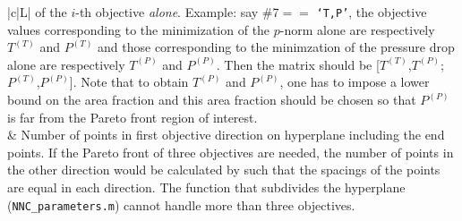 \documentclass[11pt,letterpaper]{article}
\begin{document}
\begin{table}[!h]
\begin{tabular}{|c|L|}
of the $i$-th objective \textit{alone}. Example: say \#7$==$ \texttt{`T,P'}, the objective values corresponding to the minimization of 
the $p$-norm alone are respectively $T^{(T)}$ and $P^{(T)}$ and those corresponding to the minimzation of the pressure drop alone are
respectively $T^{(P)}$ and $P^{(P)}$. Then the matrix should be [$T^{(T)}$,$T^{(P)}$;$P^{(T)}$,$P^{(P)}$].
Note that to obtain $T^{(P)}$ and $P^{(P)}$, one has to impose a lower bound on the area fraction and this area fraction should be 
chosen so that $P^{(P)}$ is far from the Pareto front region of interest. \\
 & Number of points in first objective direction on hyperplane including the end points. If the Pareto front of three objectives are needed, 
the number of points in the other direction would be calculated by such that the spacings of the points are equal in each direction. 
The function that subdivides the hyperplane (\texttt{NNC\_parameters.m}) cannot handle more than three objectives.   \\
\hline
\end{tabular}
\end{table}
\end{document}
